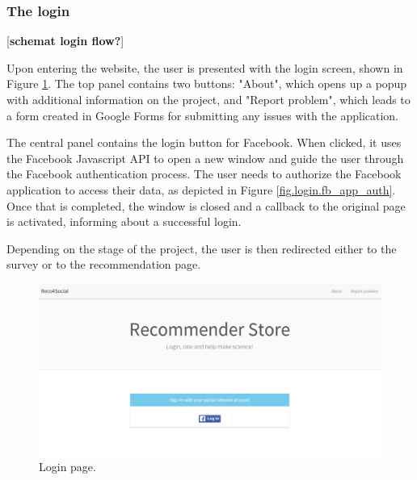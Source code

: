 \documentclass[12pt]{report}
\begin{document}
\subsubsection{The login}
[{\bf schemat login flow?}]

Upon entering the website, the user is presented with the login screen, shown in Figure \ref{fig.login}. The top panel contains two buttons: "About", which opens up a popup with additional information on the project, and "Report problem", which leads to a form created in Google Forms for submitting any issues with the application.

The central panel contains the login button for Facebook. When clicked, it uses the Facebook Javascript API to open a new window and guide the user through the Facebook authentication process. The user needs to authorize the Facebook application to access their data, as depicted in Figure \ref{fig.login.fb_app_auth}. Once that is completed, the window is closed and a callback to the original page is activated, informing about a successful login.

Depending on the stage of the project, the user is then redirected either to the survey or to the recommendation page. 

\begin{figure}[!t]
\centering
\includegraphics[width=\textwidth]{reco4_login.png} 
\caption[Login page.]{Login page.}
\label{fig.login}
\end{figure}
\end{document}
